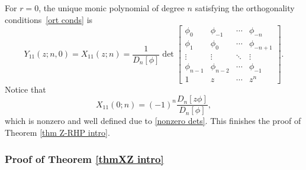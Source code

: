 \documentclass[10pt,a4paper]{amsart}
\numberwithin{equation}{section}
\begin{document}
For $r=0$, the unique monic polynomial of degree $n$ satisfying the orthogonality conditions~\eqref{ort conds} is%
	\begin{equation}\label{X11}
		Y_{11}(z;n,0)=X_{11}(z;n) = \frac{1}{D_n[\phi]} \det \begin{bmatrix}
			\phi_0 & \phi_{-1} & \cdots & \phi_{-n} \\
			\phi_1 & \phi_{0} & \cdots & \phi_{-n+1} \\
			\vdots & \vdots & \ddots & \vdots \\
			\phi_{n-1} & \phi_{n-2} & \cdots & \phi_{-1} \\
			1 & z & \cdots & z^n
		\end{bmatrix}.
	\end{equation}
	Notice that
	\begin{equation*}
		X_{11}(0;n) = (-1)^n\frac{D_n[z\phi]}{D_n[\phi]},
	\end{equation*}
	which is nonzero and well defined due to \eqref{nonzero dets}. This finishes the proof of Theorem \ref{thm Z-RHP intro}.

\subsubsection{Proof of Theorem \ref{thmXZ intro}}\label{sec proof of thm 1.8}
	
\end{document}
